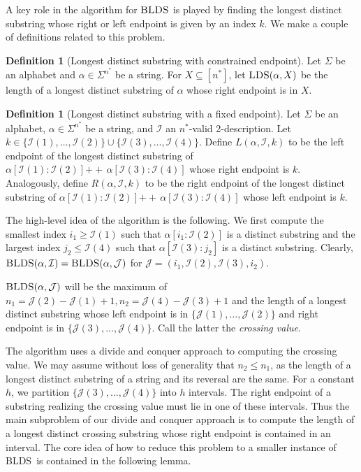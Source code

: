 \documentclass[12pt]{article}
\newcommand{\concat}{\ensuremath{+\!\!\!\!+\,}}
\newcommand{\Iset}{\mathcal{I}}
\newcommand{\Jset}{\mathcal{J}}
\newcommand{\blds}{\textsc{BLDS}}
\newcommand{\upto}{\mathbin{:}}
\newcommand{\lds}{\textsc{LDS}}
\theoremstyle{definition}
\newtheorem{definition}[theorem]{Definition}
\begin{document}
A key role in the algorithm for $\blds$ is played by finding the longest distinct substring whose right or left endpoint is given by an index $k$. We make a couple of definitions related to this problem.

\begin{definition}[Longest distinct substring with constrained endpoint]
Let $\Sigma$ be an alphabet and $\alpha \in \Sigma^{n^*}$ be a string.  For $X \subseteq [n^*]$, let $\lds(\alpha,X)$ be the length of a longest distinct substring of $\alpha$ whose right endpoint is in $X$.
\end{definition}

\begin{definition}[Longest distinct substring with a fixed endpoint]
Let $\Sigma$ be an alphabet, $\alpha \in \Sigma^{n^*}$ be a string, and $\Iset$ an $n^*$-valid 2-description.  
Let $k \in \{\Iset(1), \ldots, \Iset(2)\} \cup \{\Iset(3), \ldots, \Iset(4)\}$. 
Define $L(\alpha, \Iset, k)$  to be the left endpoint of the longest distinct substring of $\alpha[\Iset(1) \upto \Iset(2)] \concat \alpha[\Iset(3) \upto \Iset(4)]$ whose right endpoint is $k$.
Analogously, define $R(\alpha,\Iset, k)$ to be the right endpoint of the longest distinct substring of $\alpha[\Iset(1) \upto \Iset(2)] \concat \alpha[\Iset(3) \upto \Iset(4)]$ whose left endpoint is $k$.  
\end{definition}

The high-level idea of the algorithm is the following.  We first compute the smallest index $i_1 \ge \Iset(1)$ such that $\alpha[i_1 \upto \Iset(2)]$ is a distinct substring and the largest index $j_2 \le \Iset(4)$ such that $\alpha[\Iset(3) \upto j_2]$ is a distinct substring.
Clearly, $\blds(\alpha, \Iset) = \blds(\alpha, \Jset)$ for $\Jset = (i_1, \Iset(2), \Iset(3), i_2)$.

$\blds(\alpha, \Jset)$ will be the maximum of $n_1 = \Jset(2) - \Jset(1) + 1, n_2 = \Jset(4) - \Jset(3) + 1$ and the length of a longest distinct substring whose left endpoint is in $\{\Jset(1), \ldots, \Jset(2)\}$ and right endpoint is in $\{\Jset(3), \ldots, \Jset(4)\}$.  Call the latter the \emph{crossing value}.

The algorithm uses a divide and conquer approach to computing the crossing value. We may assume without loss of generality that $n_2 \le n_1$, as the length of a longest distinct substring of a string and its reversal are the same.  For a constant $h$, we partition $\{\Jset(3), \ldots, \Jset(4)\}$ into $h$ intervals.  The right endpoint of a substring realizing the crossing value must lie in one of these intervals.
Thus the main subproblem of our divide and conquer approach is to compute the length of a longest distinct crossing substring whose right endpoint is contained in an interval.  The core idea of how to reduce this problem to a smaller instance of \blds\ is contained in the following lemma.
\end{document}
